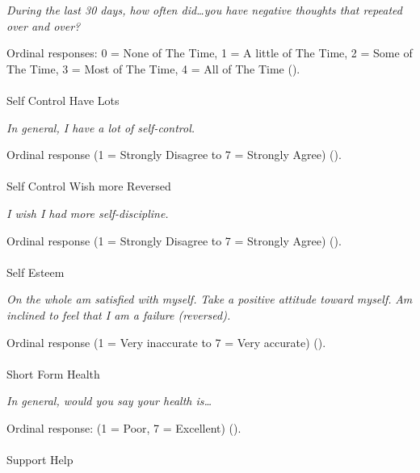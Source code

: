 \documentclass[
  single column]{article}
\makeatletter
\let\oldparagraph\paragraph
\renewcommand{\paragraph}{
    \@ifstar
      \xxxParagraphStar
      \xxxParagraphNoStar
  }
\newcommand{\xxxParagraphStar}[1]{\oldparagraph*{#1}\mbox{}}
\newcommand{\xxxParagraphNoStar}[1]{\oldparagraph{#1}\mbox{}}
\makeatother
\begin{document}
\emph{During the last 30 days, how often did\ldots you have negative
thoughts that repeated over and over?}

Ordinal responses: 0 = None of The Time, 1 = A little of The Time, 2 =
Some of The Time, 3 = Most of The Time, 4 = All of The Time
().

\paragraph{Self Control Have Lots}\label{self-control-have-lots}

\emph{In general, I have a lot of self-control.}

Ordinal response (1 = Strongly Disagree to 7 = Strongly Agree)
().

\paragraph{Self Control Wish more
Reversed}\label{self-control-wish-more-reversed}

\emph{I wish I had more self-discipline.}

Ordinal response (1 = Strongly Disagree to 7 = Strongly Agree)
().

\paragraph{Self Esteem}\label{self-esteem-1}

\emph{On the whole am satisfied with myself.} \emph{Take a positive
attitude toward myself.} \emph{Am inclined to feel that I am a failure
(reversed).}

Ordinal response (1 = Very inaccurate to 7 = Very accurate)
().

\paragraph{Short Form Health}\label{short-form-health}

\emph{In general, would you say your health is\ldots{}}

Ordinal response: (1 = Poor, 7 = Excellent)
().

\paragraph{Support Help}\label{support-help}
\end{document}
